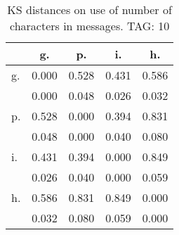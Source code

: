 \begin{table}[h!]
\begin{center}
\begin{tabular}{| l | c | c | c | c |}\hline
 & g. & p. & i. & h. \\\hline
g. & 0.000  & 0.528  & 0.431  & 0.586 \\\hline
 & 0.000  & 0.048  & 0.026  & 0.032 \\\hline
p. & 0.528  & 0.000  & 0.394  & 0.831 \\\hline
 & 0.048  & 0.000  & 0.040  & 0.080 \\\hline
i. & 0.431  & 0.394  & 0.000  & 0.849 \\\hline
 & 0.026  & 0.040  & 0.000  & 0.059 \\\hline
h. & 0.586  & 0.831  & 0.849  & 0.000 \\\hline
 & 0.032  & 0.080  & 0.059  & 0.000 \\\hline
\end{tabular}
\caption{KS distances on use of number of characters in messages. TAG: 10}
\end{center}
\end{table}